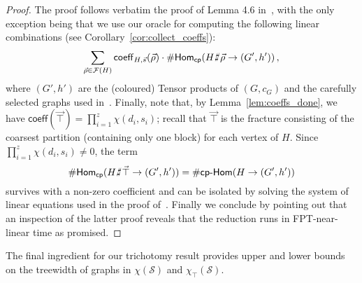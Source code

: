 \documentclass[authorcolumns,numberwithinsect]{no-lipics-v2022}
\newcommand{\homsupp}{\chi}
\def\fracture#1#2{\ensuremath{#1\raisebox{.2ex}{\rotatebox[origin=c]{-15}{$\sharp$}}#2}}
\newcommand{\homscp}{\mathsf{Hom}_{\mathsf{cp}}}
\newcommand{\cphoms}{\mathsf{cp}\text{-}\mathsf{Hom}}
\def\fracture#1#2{\ensuremath{#1\raisebox{.2ex}{\rotatebox[origin=c]{-15}{$\sharp$}}#2}}
\begin{document}
\begin{proof}
    The proof follows verbatim the proof of Lemma 4.6 in~\cite{PeyerimhoffRSSVW23}, with the only exception being that we use our oracle for computing the following linear combinations (see Corollary~\ref{cor:collect_coeffs}):
    \[\sum_{\vec{\rho}\in \mathcal{F}(H)} \mathsf{coeff}_{H,\vec{s}}(\vec{\rho})  \cdot \#\homscp(\fracture{H}{\vec{\rho}} \to (G',h'))\,,\]
    where $(G',h')$ are the (coloured) Tensor products of $(G,c_G)$ and the carefully selected graphs used in~\cite[Lemma 4.6]{PeyerimhoffRSSVW23}.
    Finally, note that, by Lemma~\ref{lem:coeffs_done}, we have $\mathsf{coeff}(\vec{\top}) = \prod_{i= 1}^z \chi(d_i,s_i)$; recall that $\vec{\top}$ is the fracture consisting of the coarsest partition (containing only one block) for each vertex of $H$. Since  $ \prod_{i=1}^z \chi(d_i,s_i) \neq 0$, the term 
    \[ \#\homscp(\fracture{H}{\vec{\top}} \to (G',h')) = \#\cphoms(H \to (G',h')) \]
    survives with a non-zero coefficient and can be isolated by solving the system of linear equations used in the proof of~\cite[Lemma 4.6]{PeyerimhoffRSSVW23}. Finally we conclude by pointing out that an inspection of the latter proof reveals that the reduction runs in FPT-near-linear time as promised.
\end{proof}

The final ingredient for our trichotomy result provides upper and lower bounds on the treewidth of graphs in $\homsupp(\mathcal{S})$ and $\homsupp_\top(\mathcal{S})$.
\end{document}

